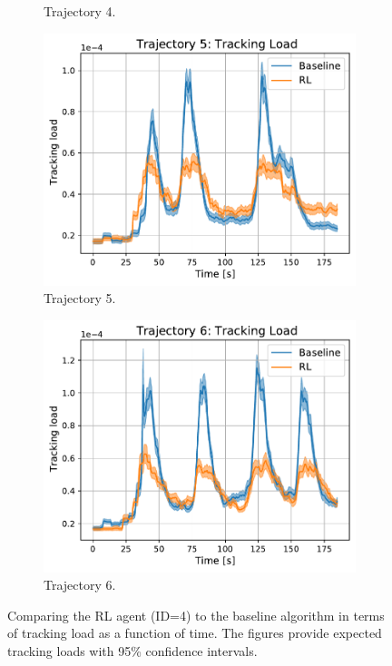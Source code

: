 \documentclass[english, 12pt, a4paper, elec, utf8, a-1b, online]{aaltothesis}
\numberwithin{equation}{section}
\begin{document}
\begin{figure}
\begin{subfigure}[b]{0.45\textwidth}
        \caption{Trajectory 4.}
        \label{fig:TL_T4}
    \end{subfigure}
    \hfill
    \begin{subfigure}[b]{0.45\textwidth}
        \centering
        \includegraphics[width=\linewidth]{figures/benchmark/Simulations/tracking_load_4.pdf}
        \caption{Trajectory 5.}
        \label{fig:TL_T5}
    \end{subfigure}
    \hfill
    \begin{subfigure}[b]{0.45\textwidth}
        \centering
        \includegraphics[width=\linewidth]{figures/benchmark/Simulations/tracking_load_5.pdf}
        \caption{Trajectory 6.}
        \label{fig:TL_T6}
    \end{subfigure}
    \caption{Comparing the RL agent (ID=4) to the baseline algorithm in terms of tracking load as a function of time. The figures provide expected tracking loads with 95\% confidence intervals.}
    \label{fig:tracking_load_comparison}
\end{figure}
\end{document}
